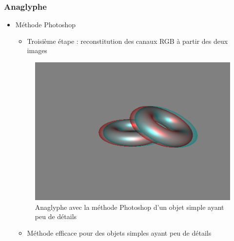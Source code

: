 \documentclass{beamer}
\begin{document}
%
\begin{frame}
\frametitle{Anaglyphe}
\begin{itemize}[label=$\bullet$]
\item Méthode Photoshop \cite{stereoAnaglyph}
	\begin{itemize}[label=$\circ$]
	\item Troisième étape : reconstitution des canaux RGB à partir des deux images
	\end{itemize}

\begin{figure}
\centering
\includegraphics[scale=0.25]{donuts_photoshop.png}
\caption{Anaglyphe avec la méthode Photoshop d'un objet simple ayant peu de détails }
\end{figure}
	\begin{itemize}[label=$\circ$]
	\item Méthode efficace pour des objets simples ayant peu de détails
	\end{itemize}
\end{itemize}

\end{frame}
\end{document}
